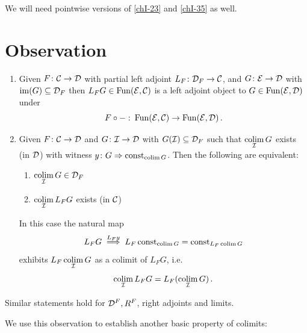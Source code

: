         We will need pointwise versions of \ref{chI-23} and \ref{chI-35} as well.
    \section{Observation}\label{chI-36}
        \begin{enumerate}[label=\roman*)]
            \item 
                Given $F \colon \mathcal{C} \to \mathcal{D}$ with partial left adjoint $L_F \colon \mathcal{D}_F \to \mathcal{C}$, and $G \colon \mathcal{E} \to \mathcal{D}$ with $\operatorname{im}(G) \subseteq \mathcal{D}_F$ then $L_F G \in \operatorname{Fun}(\mathcal{E}, \mathcal{C})$ is a left adjoint object to $G \in \operatorname{Fun}(\mathcal{E}, \mathcal{D})$ under
                \begin{equation*}
                    F \circ - \,\colon \operatorname{Fun}(\mathcal{E}, \mathcal{C}) \to \operatorname{Fun}(\mathcal{E}, \mathcal{D}) \,.
                \end{equation*}\label{chI-36-i}
            \item 
                Given $F \colon \mathcal{C} \to \mathcal{D}$ and $G \colon \mathcal{I} \to \mathcal{D}$ with $G(\mathcal{I}) \subseteq \mathcal{D}_F$ such that $\operatorname*{colim}\limits_{\mathcal{I}} G$ exists (in $\mathcal{D}$) with witness $y \colon G \Rightarrow \operatorname{const}_{\operatorname*{colim} G}$. Then the following are equivalent:
                \begin{enumerate}[label=\alph*)]
                    \item 
                        $\operatorname*{colim}\limits_{\mathcal{I}} G \in \mathcal{D}_F$
                    \item 
                        $\operatorname*{colim}\limits_{\mathcal{I}} L_F G$ exists (in $\mathcal{C}$)
                \end{enumerate}
                In this case the natural map
                \begin{equation*}
                    L_F G \overset{L_F y}{\implies} L_F \operatorname{const}_{\operatorname*{colim} G} = \operatorname{const}_{L_F \operatorname*{colim} G}
                \end{equation*}
                exhibits $L_F \operatorname*{colim}\limits_{\mathcal{I}} G$ as a colimit of $L_F G$, i.e.
                \begin{equation*}
                    \operatorname*{colim}\limits_{\mathcal{I}} L_F G = L_F(\operatorname*{colim}\limits_{\mathcal{I}} G) \,.
                \end{equation*}\label{chI-36-ii}
        \end{enumerate}
        Similar statements hold for $\mathcal{D}^F, R^F$, right adjoints and limits.
        \medskip

        We use this observation to establish another basic property of colimits:

